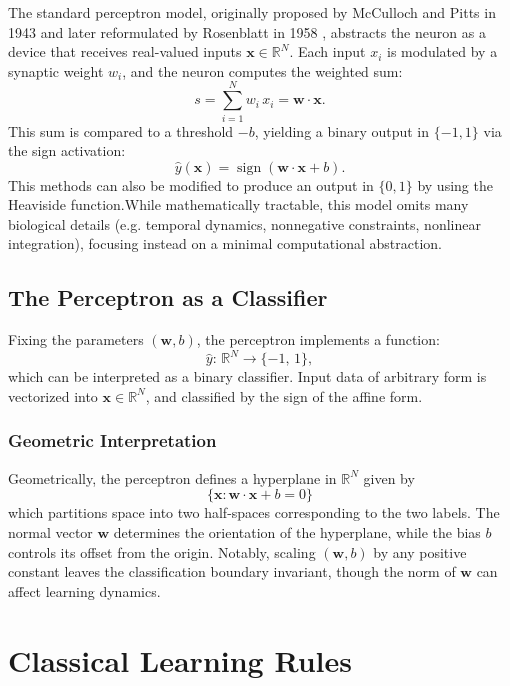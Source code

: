 \documentclass[a4paper,12pt]{report}
\begin{document}
The standard perceptron model, originally proposed by McCulloch and Pitts in 1943 
\cite{McCulloch1943} and later reformulated by Rosenblatt in 1958 \cite{Rosenblatt1958}, 
abstracts the neuron as a device that receives real-valued inputs 
$\mathbf{x}\in\mathbb R^N$. Each input $x_i$ is modulated by a synaptic weight $w_i$, 
and the neuron computes the weighted sum:
\[
  s = \sum_{i=1}^N w_i\,x_i = \mathbf{w}\cdot\mathbf{x}.
\]
This sum is compared to a threshold $-b$, yielding a binary output in $\{-1,1\}$ via 
the sign activation:
\[
  \hat y(\mathbf{x}) = \operatorname{sign}(\mathbf{w}\cdot\mathbf{x} + b).
\]
This methods can also be modified to produce an output in $\{0, 1\}$ by using the 
Heaviside function.While mathematically tractable, this model omits many biological 
details (e.g. temporal dynamics, nonnegative constraints, nonlinear integration), 
focusing instead on a minimal computational abstraction.

\subsection*{The Perceptron as a Classifier}
Fixing the parameters $(\mathbf{w},b)$, the perceptron implements a function:
\[
  \hat y:\,\mathbb R^N \to \{ -1,\,1 \},
\]
which can be interpreted as a binary classifier. Input data of arbitrary form is 
vectorized into 
$\mathbf{x}\in\mathbb R^N$, and classified by the sign of the affine form.

\subsubsection*{Geometric Interpretation}
Geometrically, the perceptron defines a hyperplane in $\mathbb R^N$ given by
\[
    \{\mathbf{x}: \mathbf{w}\cdot\mathbf{x} + b = 0\}
\]
which partitions space into two half-spaces corresponding to the two labels. The 
normal vector $\mathbf{w}$ determines the orientation of the hyperplane, while the 
bias $b$ controls its offset from the origin. Notably, scaling $(\mathbf{w},b)$ by 
any positive constant leaves the classification boundary invariant, though the norm 
of $\mathbf{w}$ can affect learning dynamics.


\section{Classical Learning Rules}\label{sec:learning_rules}
\end{document}
